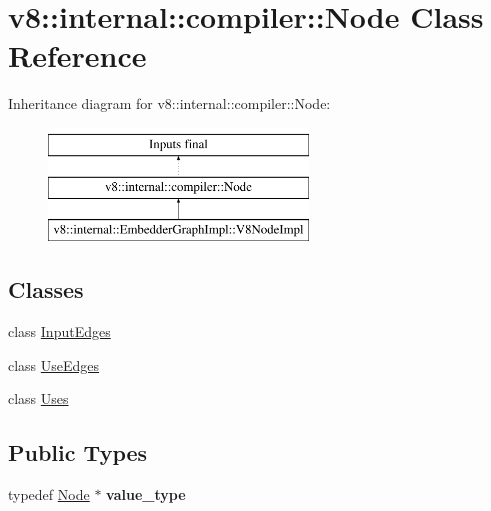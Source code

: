 \hypertarget{classv8_1_1internal_1_1compiler_1_1Node}{}\section{v8\+:\+:internal\+:\+:compiler\+:\+:Node Class Reference}
\label{classv8_1_1internal_1_1compiler_1_1Node}
Inheritance diagram for v8\+:\+:internal\+:\+:compiler\+:\+:Node\+:\begin{figure}[H]
\begin{center}
\leavevmode
\includegraphics[height=3.000000cm]{classv8_1_1internal_1_1compiler_1_1Node}
\end{center}
\end{figure}
\subsection*{Classes}
\begin{DoxyCompactItemize}
\item 
class \mbox{\hyperlink{classv8_1_1internal_1_1compiler_1_1Node_1_1InputEdges}{Input\+Edges}}
\item 
class \mbox{\hyperlink{classv8_1_1internal_1_1compiler_1_1Node_1_1UseEdges}{Use\+Edges}}
\item 
class \mbox{\hyperlink{classv8_1_1internal_1_1compiler_1_1Node_1_1Uses}{Uses}}
\end{DoxyCompactItemize}
\subsection*{Public Types}
\begin{DoxyCompactItemize}
\item 
\mbox{\label{classv8_1_1internal_1_1compiler_1_1Node_a8396395c4dc7cfaa7ed3232def0ab8e3}} 
typedef \mbox{\hyperlink{classv8_1_1internal_1_1compiler_1_1Node}{Node}} $\ast$ {\bfseries value\+\_\+type}
\end{DoxyCompactItemize}
